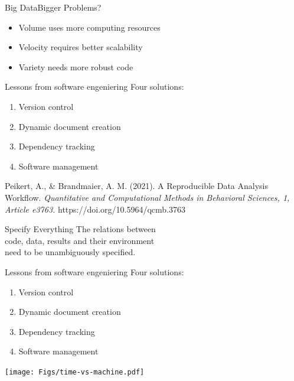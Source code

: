 \documentclass[12pt,t]{beamer}
\begin{document}
{\begin{frame}[c]{Big Data\textemdash{}Bigger Problems?}
  \begin{itemize}
  \item Volume uses more computing resources
  \item Velocity requires better scalability
  \item Variety needs more robust code
  \end{itemize}
\end{frame}

\begin{frame}[c]{Lessons from software engeniering}
Four solutions:
  \begin{enumerate}
    \item Version control
    \item Dynamic document creation
    \item Dependency tracking
    \item Software management
  \end{enumerate}
	\vfill
	\textcolor{lolit}{\tiny Peikert, A., \& Brandmaier, A. M. (2021). A Reproducible Data Analysis Workflow. \textit{Quantitative and Computational Methods in Behavioral Sciences, 1, Article e3763.} https://doi.org/10.5964/qcmb.3763}
\end{frame}

\begin{frame}[c]{Specify Everything}
  The relations between\\
  \textcolor{hilit}{code}, \textcolor{hilit}{data}, \textcolor{hilit}{results} and their \textcolor{hilit}{environment}\\
  need to be \textcolor{vhilit}{unambiguously} specified.
\end{frame}

\begin{frame}[c]{Lessons from software engeniering}
Four solutions:
  \begin{enumerate}
    \item \textcolor{vhilit}{Version control}
    \item \textcolor{vhilit}{Dynamic document creation}
    \item \textcolor{hilit}{Dependency tracking}
    \item \textcolor{hilit}{Software management}
  \end{enumerate}
  \hfill \texttt{[image: Figs/time-vs-machine.pdf]}

\end{frame}

}
\end{document}
